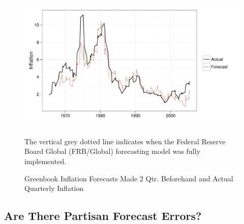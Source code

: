 \documentclass[a4paper]{article}
\begin{document}
\begin{figure}[t]
    \caption{Greenbook Inflation Forecasts Made 2 Qtr. Beforehand and Actual Quarterly Inflation}
    \label{absolute}
    \begin{center}
    
\begin{knitrout}
\color{fgcolor}

{\centering \includegraphics[width=0.8\linewidth]{figure/BaseInflation} 

}



\end{knitrout}

    
    \end{center}
    \begin{singlespace}
        {\scriptsize{The vertical grey dotted line indicates when the Federal Reserve Board Global (FRB/Global) forecasting model was fully implemented.  
                      }}
    \end{singlespace}
\end{figure}


\subsection{Are There Partisan Forecast Errors?}

\begin{knitrout}
\color{fgcolor}\begin{kframe}


{\ttfamily\noindent\bfseries\color{errorcolor}{\#\# Error: there is no package called 'plotrix'}}\end{kframe}
\end{knitrout}
\end{document}
